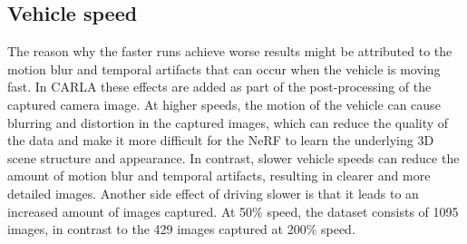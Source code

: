 \begin{comment}
The qualitative assessment shows clear evidence of higher resolution images leading to higher fidelity renders, although the metrics suggest otherwise. When using lower-resolution images, the metrics may become less sensitive because they are less affected by small differences between the synthesized and ground-truth images. This is because lower-resolution images have fewer pixels, which can make the metrics less precise in measuring the perceptual similarity between the images. However, using lower-resolution images can also lead to a loss of detail and fidelity in the synthesized images. When comparing low-resolution images with high-resolution images, these metrics may become less effective because the high-resolution images are more sensitive to small differences between the synthesized and ground-truth images. In other words, the NeRF may generate high-quality images that are perceptually similar to the ground-truth images, but small differences in the pixel values or noise can cause a significant decrease in the metric scores.

The chosen resolution of $400 \times 300$ aligns well with the chosen number of frames from the previous experiment. With 2 ticks per image, $\sim615$ images for the baseline, we have $\sim73$ million pixels. The training will cover about 84\% of the input pixels.

This might be a special case for synthetic data where we have perfect camera poses. With higher-resolution images, the requirement for accurate camera poses increases as the camera poses have to be aligned pixel perfect with the image.
\end{comment}












\subsection{Vehicle speed}
The reason why the faster runs achieve worse results might be attributed to the motion blur and temporal artifacts that can occur when the vehicle is moving fast. In CARLA these effects are added as part of the post-processing of the captured camera image. At higher speeds, the motion of the vehicle can cause blurring and distortion in the captured images, which can reduce the quality of the data and make it more difficult for the NeRF to learn the underlying 3D scene structure and appearance. In contrast, slower vehicle speeds can reduce the amount of motion blur and temporal artifacts, resulting in clearer and more detailed images. Another side effect of driving slower is that it leads to an increased amount of images captured. At 50\% speed, the dataset consists of 1095 images, in contrast to the 429 images captured at 200\% speed.


